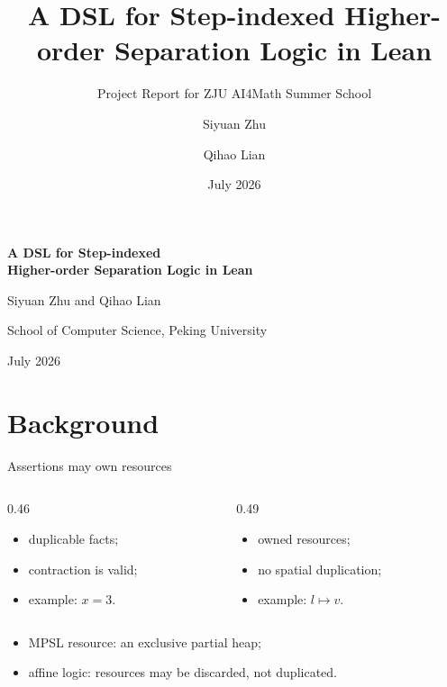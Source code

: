 \documentclass[10pt,aspectratio=169]{beamer}
\title[MPSL]{A DSL for Step-indexed Higher-order Separation Logic in Lean}
\subtitle{Project Report for ZJU AI4Math Summer School}
\author[Siyuan Zhu et al.]{Siyuan Zhu \and Qihao Lian}
\institute[Peking University]{School of Computer Science, Peking University}
\date{July 2026}
\begin{document}
\begin{frame}
  \vspace{1.35cm}
  {\Huge\bfseries\textcolor{PKURed}{A DSL for Step-indexed \\Higher-order Separation Logic in Lean}\par}
  \vspace{1.50cm}
  {\normalsize Siyuan Zhu and Qihao Lian\par}
  \vspace{0.10cm}
  {\normalsize School of Computer Science, Peking University\par}
  \vspace{0.45cm}
  {\normalsize July 2026\par}
\end{frame}

\section{Background}

\begin{frame}{Assertions may own resources}
  \begin{columns}[T,onlytextwidth]
    \begin{column}{0.46\textwidth}
      \begin{itemize}
        \item duplicable facts;
        \item contraction is valid;
        \item example: $x=3$.
      \end{itemize}
    \end{column}
    \begin{column}{0.49\textwidth}
      \begin{itemize}
        \item owned resources;
        \item no spatial duplication;
        \item example: $l\mapsto v$.
      \end{itemize}
    \end{column}
  \end{columns}

  \vspace{0.55cm}

  \begin{itemize}
    \item MPSL resource: an exclusive partial heap;
    \item affine logic: resources may be discarded, not duplicated.
  \end{itemize}
\end{frame}
\end{document}
